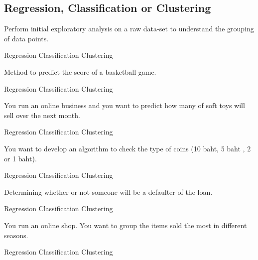 \subsection{Regression, Classification or Clustering}
\small{
\begin{questions} %
\question Perform initial exploratory analysis on a raw data-set to understand the grouping of data points.\\
\begin{oneparchoices}
 \choice  Regression
 \choice  Classification
 \choice  Clustering
\end{oneparchoices}
\question Method to predict the score of a basketball game. \\
\begin{oneparchoices}
 \choice  Regression
 \choice  Classification
 \choice  Clustering
\end{oneparchoices}
\question You run an online business and you want to predict how many of soft toys will sell over the next month.\\
\begin{oneparchoices}
 \choice  Regression
 \choice  Classification
 \choice  Clustering
\end{oneparchoices}
\question You want to develop an algorithm to check the type of coins (10 baht, 5 baht , 2 or 1 baht).\\
\begin{oneparchoices}
 \choice  Regression
 \choice  Classification
 \choice  Clustering
\end{oneparchoices}
\question Determining whether or not someone will be a defaulter of the loan.\\
\begin{oneparchoices}
 \choice  Regression
 \choice  Classification
 \choice  Clustering
\end{oneparchoices}
\question You run an online shop. You want to group the items sold the most in different seasons.\\
\begin{oneparchoices}
 \choice  Regression
 \choice  Classification
 \choice  Clustering
\end{oneparchoices}
\end{questions}
}

